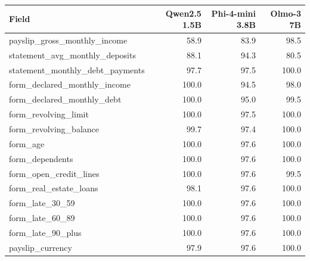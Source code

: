 \begin{tabular}{lrrr}
\toprule
Field & Qwen2.5 1.5B & Phi-4-mini 3.8B & Olmo-3 7B \\
\midrule
payslip\_gross\_monthly\_income & 58.9 & 83.9 & 98.5 \\
statement\_avg\_monthly\_deposits & 88.1 & 94.3 & 80.5 \\
statement\_monthly\_debt\_payments & 97.7 & 97.5 & 100.0 \\
form\_declared\_monthly\_income & 100.0 & 94.5 & 98.0 \\
form\_declared\_monthly\_debt & 100.0 & 95.0 & 99.5 \\
form\_revolving\_limit & 100.0 & 97.5 & 100.0 \\
form\_revolving\_balance & 99.7 & 97.4 & 100.0 \\
form\_age & 100.0 & 97.6 & 100.0 \\
form\_dependents & 100.0 & 97.6 & 100.0 \\
form\_open\_credit\_lines & 100.0 & 97.6 & 99.5 \\
form\_real\_estate\_loans & 98.1 & 97.6 & 100.0 \\
form\_late\_30\_59 & 100.0 & 97.6 & 100.0 \\
form\_late\_60\_89 & 100.0 & 97.6 & 100.0 \\
form\_late\_90\_plus & 100.0 & 97.6 & 100.0 \\
payslip\_currency & 97.9 & 97.6 & 100.0 \\
\bottomrule
\end{tabular}
